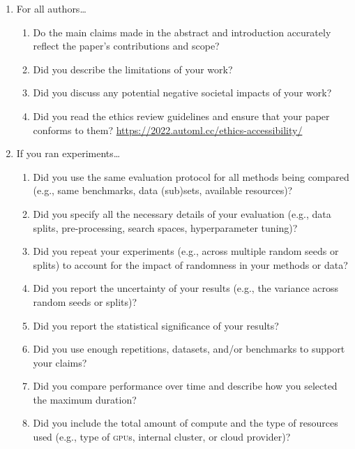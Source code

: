 \documentclass[11pt]{article}
\begin{document}
\begin{enumerate}
\item For all authors\dots
  \begin{enumerate}
  \item Do the main claims made in the abstract and introduction accurately
    reflect the paper's contributions and scope?
    \answerTODO{}
  \item Did you describe the limitations of your work?
    \answerTODO{}
  \item Did you discuss any potential negative societal impacts of your work?
    \answerTODO{}
  \item Did you read the ethics review guidelines and ensure that your paper
    conforms to them? \url{https://2022.automl.cc/ethics-accessibility/}
    \answerTODO{}
  \end{enumerate}
\item If you ran experiments\dots
  \begin{enumerate}
  \item Did you use the same evaluation protocol for all methods being compared (e.g.,
    same benchmarks, data (sub)sets, available resources)?
    \answerTODO{}
  \item Did you specify all the necessary details of your evaluation (e.g., data splits,
    pre-processing, search spaces, hyperparameter tuning)?
    \answerTODO{}
  \item Did you repeat your experiments (e.g., across multiple random seeds or splits) to account for the impact of randomness in your methods or data?
    \answerTODO{}
  \item Did you report the uncertainty of your results (e.g., the variance across random seeds or splits)?
    \answerTODO{}
  \item Did you report the statistical significance of your results?
    \answerTODO{}
  \item Did you use enough repetitions, datasets, and/or benchmarks to support your claims?
    \answerTODO{}
  \item Did you compare performance over time and describe how you selected the maximum duration?
    \answerTODO{}
  \item Did you include the total amount of compute and the type of resources
    used (e.g., type of \textsc{gpu}s, internal cluster, or cloud provider)?
    \answerTODO{}

\end{enumerate}
\end{enumerate}
\end{document}
